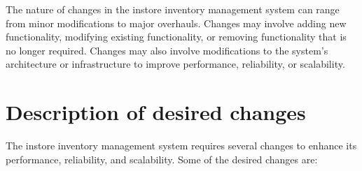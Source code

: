 The nature of changes in the instore inventory management system can range from minor modifications to major overhauls. Changes may involve adding new functionality, modifying existing functionality, or removing functionality that is no longer required. Changes may also involve modifications to the system's architecture or infrastructure to improve performance, reliability, or scalability.


\section{Description of desired changes \label{Section::Descriptionofdesiredchanges}}
The instore inventory management system requires several changes to enhance its performance, reliability, and scalability. Some of the desired changes are:


